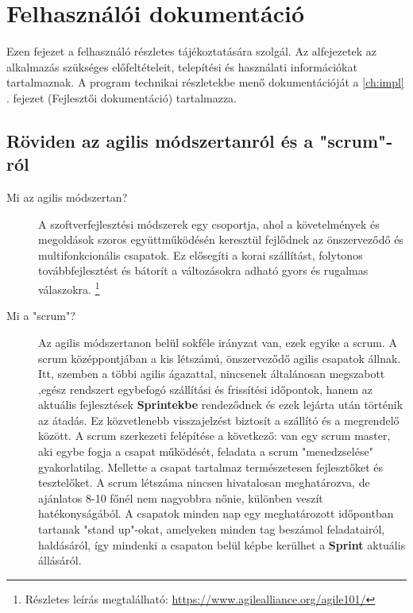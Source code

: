 \chapter{Felhasználói dokumentáció} %
\label{ch:user}

Ezen fejezet a felhasználó részletes tájékoztatására szolgál. Az alfejezetek az alkalmazás szükséges előfeltételeit, telepítési és használati információkat tartalmaznak. A program technikai részletekbe menő dokumentációját a \ref{ch:impl} . fejezet (Fejlesztői dokumentáció) tartalmazza.


\section{Röviden az agilis módszertanról és a  "scrum"-ról} %

\begin{description}
	\item[Mi az agilis módszertan?] A szoftverfejlesztési módszerek egy csoportja, ahol a követelmények és megoldások szoros együttműködésén keresztül fejlődnek az önszerveződő  és 		     	multifonkcionális csapatok. Ez elősegíti a korai szállítást, folytonos továbbfejlesztést és bátorít a változásokra adható gyors és rugalmas válaszokra. \footnote{Részletes leírás 		 	   	megtalálható: \url{https://www.agilealliance.org/agile101/}}
	\item[Mi a "scrum"?] Az agilis módszertanon belül sokféle irányzat van, ezek egyike a scrum. A scrum középpontjában a kis létszámú, önszerveződő agilis csapatok állnak. Itt,
 szemben a többi agilis ágazattal, nincsenek általánosan megszabott ,egész rendszert egybefogó szállítási és frissítési időpontok, hanem az aktuális fejlesztések \textbf{Sprintekbe} rendeződnek és ezek lejárta után történik az átadás. Ez közvetlenebb visszajelzést biztosít a szállító és a megrendelő között. A scrum szerkezeti felépítése a következő: van egy scrum master, aki egybe fogja a csapat működését, feladata a scrum "menedzselése" gyakorlatilag. Mellette a csapat tartalmaz természetesen fejlesztőket és tesztelőket. A scrum létszáma nincsen hivatalosan meghatározva, de ajánlatos 8-10 főnél nem nagyobbra nőnie, különben veszít hatékonyságából. A csapatok minden nap egy meghatározott időpontban tartanak "stand up"-okat, amelyeken minden tag beszámol feladatairól, haldásáról, így mindenki a csapaton belül képbe kerülhet a \textbf{Sprint} aktuális állásáról.
\end{description}


